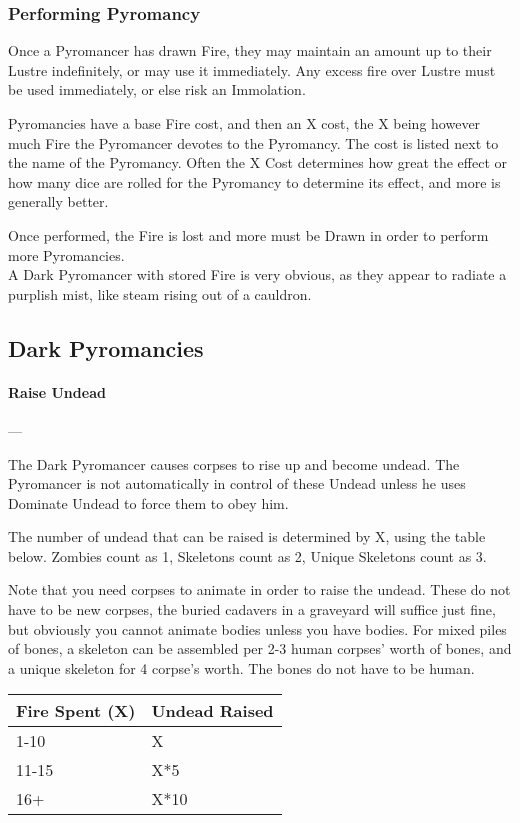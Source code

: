 \documentclass[oneside,11pt,english]{book}
\begin{document}
\subsubsection{Performing Pyromancy}
Once a Pyromancer has drawn Fire, they may maintain an amount up to their Lustre
indefinitely, or may use it immediately. Any excess fire over Lustre must be
used immediately, or else risk an Immolation.

Pyromancies have a base Fire cost, and then an X cost, the X being however much
Fire the Pyromancer devotes to the Pyromancy. The cost is listed next to the
name of the Pyromancy. Often the X Cost determines how great the effect or how
many dice are rolled for the Pyromancy to determine its effect, and more is
generally better.

Once performed, the Fire is lost and more must be Drawn in order to perform more Pyromancies.\\
A Dark Pyromancer with stored Fire is very obvious, as they appear to radiate a
purplish mist, like steam rising out of a cauldron.

\subsection{Dark Pyromancies}
\paragraph{Raise Undead}
---\quad [4+X]

The Dark Pyromancer causes corpses to rise up and become undead. The Pyromancer
is not automatically in control of these Undead unless he uses Dominate Undead
to force them to obey him.

The number of undead that can be raised is determined by X, using the table
below. Zombies count as 1, Skeletons count as 2, Unique Skeletons count as 3.

Note that you need corpses to animate in order to raise the undead. These do not
have to be new corpses, the buried cadavers in a graveyard will suffice just
fine, but obviously you cannot animate bodies unless you have bodies. For mixed
piles of bones, a skeleton can be assembled per 2-3 human corpses’ worth of
bones, and a unique skeleton for 4 corpse’s worth. The bones do not have to be
human.

\begin{center}
  \begin{tabu} spread 0pt {X[-1] X[-1]}
    Fire Spent (X) & Undead Raised \\ -10           & X             \\
    11-15          & X*5           \\
    16+            & X*10          \\
  \end{tabu}
\end{center}
\end{document}
